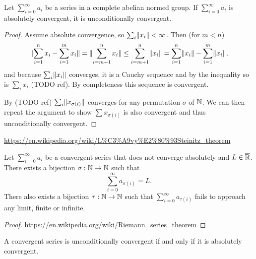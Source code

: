 \begin{proposition} \label{absoluteConvergenceImpliesConvergence}
Let $\sum_{i=0}^\infty a_i$ be a series in a complete abelian normed group. If $\sum_{i=0}^\infty a_i$ is absolutely convergent, it is unconditionally convergent.
\end{proposition}
\begin{proof}
Assume absolute convergence, so $\sum_i\lVert x_i\rVert<\infty$. Then (for $m< n$)
\[ \lVert\sum_{i=1}^n x_i - \sum_{i=1}^m x_i\rVert = \lVert\sum_{i=m+1}^n x_i\rVert \leq \sum_{i=m+1}^n\lVert x_i\rVert = \sum_{i=1}^n \lVert x_i\rVert - \sum_{i=1}^m \lVert x_i\rVert, \]
and because $\sum_i\lVert x_i\rVert$ converges, it is a Cauchy sequence and by the inequality so is $\sum_i x_i$ (TODO ref). By completeness this sequence is convergent.

By (TODO ref) $\sum_i\lVert x_{\sigma(i)}\rVert$ converges for any permutation $\sigma$ of $\mathbb{N}$. We can then repeat the argument to show $\sum x_{\sigma(i)}$ is also convergent and thus unconditionally convergent.
\end{proof}

\begin{proposition}
\url{https://en.wikipedia.org/wiki/L%C3%A9vy%E2%80%93Steinitz_theorem}
\end{proposition}
\begin{corollary}
Let $\sum_{i=0}^\infty a_i$ be a convergent series that does not converge absolutely and $L\in \overline{\mathbb{R}}$. There exists a bijection $\sigma:\mathbb{N}\to\mathbb{N}$ such that
\[ \sum_{i=0}^\infty a_{\sigma(i)} = L. \]
There also exists a bijection $\tau:\mathbb{N}\to\mathbb{N}$ such that $\sum_{i=0}^\infty a_{\tau(i)}$ fails to approach any limit, finite or infinite.
\end{corollary}
\begin{proof}
\url{https://en.wikipedia.org/wiki/Riemann_series_theorem}
\end{proof}
\begin{corollary}
A convergent series is unconditionally convergent \textup{if and only if} it is absolutely convergent.
\end{corollary}



